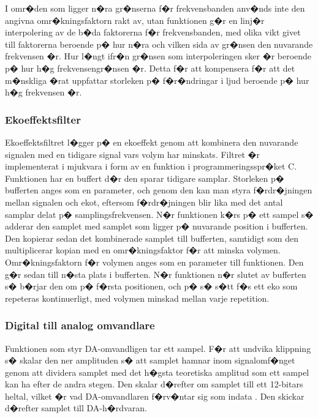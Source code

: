 \documentclass[a4paper]{article}
\begin{document}
I omr�den som ligger n�ra gr�nserna f�r frekvensbanden anv�nds inte den 
angivna omr�kningsfaktorn rakt av, utan funktionen g�r en linj�r interpolering
av de b�da faktorerna f�r frekvensbanden, med olika vikt givet till faktorerna
beroende p� hur n�ra och vilken sida av gr�nsen den nuvarande frekvensen �r. 
Hur l�ngt ifr�n gr�nsen som interpoleringen sker �r beroende p�
hur h�g frekvensengr�nsen �r. Detta f�r att kompensera f�r att det
m�nskliga �rat uppfattar storleken p� f�r�ndringar i ljud beroende p� hur h�g
frekvensen �r.


\subsubsection{Ekoeffektsfilter}

Ekoeffektsfiltret l�gger p� en ekoeffekt genom att kombinera den nuvarande 
signalen med en tidigare signal vars volym har minskats. Filtret �r 
implementerat i mjukvara i form av en funktion i programmeringsspr�ket C.
Funktionen har en buffert d�r den sparar tidigare samplar. Storleken p� 
bufferten anges som en parameter, och genom den kan man styra f�rdr�jningen 
mellan signalen och ekot, eftersom f�rdr�jningen blir lika med det antal 
samplar delat p� samplingsfrekvensen. N�r funktionen k�rs p� ett sampel s�
adderar den samplet med samplet som ligger p� nuvarande position i bufferten.
Den kopierar sedan det kombinerade samplet till bufferten, samtidigt som den
multiplicerar kopian med en omr�kningsfaktor f�r att minska volymen.
Omr�kningsfaktorn f�r volymen anges som en parameter till funktionen. Den g�r
sedan till n�sta plats i bufferten. N�r funktionen n�r slutet av bufferten s�
b�rjar den om p� f�rsta positionen, och p� s� s�tt f�s ett eko som repeteras
kontinuerligt, med volymen minskad mellan varje repetition.


\subsubsection{Digital till analog omvandlare}
Funktionen som styr DA-omvandligen tar ett sampel. F�r att undvika klippning
s� skalar den ner amplituden s� att samplet hamnar inom signalomf�nget
genom att dividera samplet med det h�gsta teoretiska amplitud som ett sampel
kan ha efter de andra stegen. Den skalar d�refter om samplet till ett
12-bitars heltal, vilket �r vad DA-omvandlaren f�rv�ntar sig som indata \cite{stmdata}.
Den skickar d�refter samplet till DA-h�rdvaran.
\end{document}
